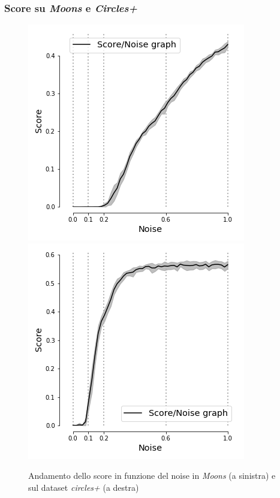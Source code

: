 \documentclass{beamer}
\begin{document}
\begin{frame}
 \frametitle{Score su \textit{Moons} e \textit{Circles+}}
  \begin{figure}[H]
   \includegraphics[scale = 0.42]{images/score_noise_moons.png}
   \includegraphics[scale = 0.42]{images/score_noise_circles+.png}
   \caption{\large Andamento dello score in funzione del noise in \textit{Moons} (a sinistra) e sul dataset \textit{circles+} (a destra)}
    \end{figure}

\end{frame}
\end{document}

